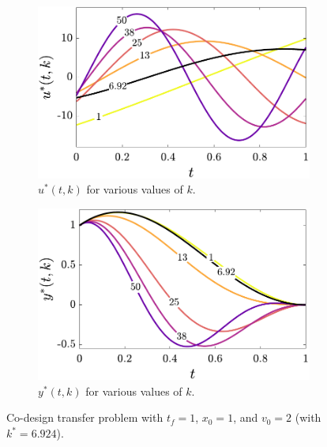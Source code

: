 \begin{figure}[t]
\begin{subfigure}[b]{0.4\textwidth}
    \centering
    \includegraphics[width=\textwidth]{../ch4/figures/transfer_u}
    \caption{$u^*(t,k)$ for various values of $k$.}
\end{subfigure}%
\begin{subfigure}[b]{0.4\textwidth}
    \centering
    \includegraphics[width=\textwidth]{../ch4/figures/transfer_x}
    \caption{$y^*(t,k)$ for various values of $k$.}
\end{subfigure}

\caption[Co-design transfer problem]{Co-design transfer problem with $t_f = 1$, $x_0 = 1$, and $v_0 = 2$ (with $k^* = 6.924$).\label{fig:ch4:transfer_solution}}
\end{figure}